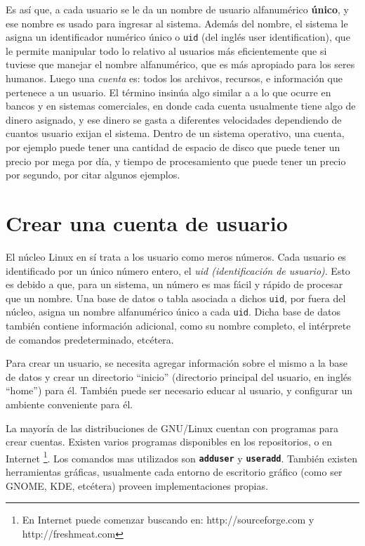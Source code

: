 \documentclass[12pt]{article}
\begin{document}
Es así que, a cada usuario se le da un nombre de usuario alfanumérico  
\textbf{único}, y ese nombre es usado para ingresar al sistema. 
Además del nombre, el sistema le asigna un identificador numérico único o 
\texttt{uid} (del inglés user identification), que le permite manipular todo 
lo relativo al usuarios más eficientemente que si tuviese que manejar el 
nombre alfanumérico, que es más apropiado para los seres humanos.   
Luego una \textit{cuenta} es: todos los archivos, recursos, e información 
que pertenece a un usuario. El término insinúa algo similar a 
a lo que ocurre en bancos y en sistemas comerciales, en donde cada cuenta 
usualmente tiene algo de dinero asignado, y ese dinero se gasta a 
diferentes velocidades dependiendo de cuantos usuario exijan el sistema.
Dentro de un sistema operativo, una cuenta, por ejemplo  puede tener una 
cantidad de espacio de disco que puede tener un precio por mega por día, y
tiempo de procesamiento que puede tener un precio por segundo, por citar algunos
ejemplos. 

\section*{Crear una cuenta de usuario}
El núcleo Linux en sí trata a los usuario como meros números. Cada
usuario es identificado por un único número entero, el \textit{uid
(identificación de usuario)}. Esto es debido a que, para un sistema, un número es mas fácil
y rápido de procesar que un nombre. Una base de datos o tabla
asociada a dichos \texttt{uid}, por fuera del núcleo, asigna un nombre alfanumérico 
único a cada \texttt{uid}. Dicha base de datos también contiene información adicional, 
como su nombre completo, el intérprete de comandos predeterminado, etcétera. 

Para crear un usuario, se necesita agregar información sobre el mismo a la
base de datos y crear un directorio ``inicio'' (directorio principal
del usuario, en inglés ``home'') para él. También puede ser necesario educar al 
usuario, y configurar un ambiente conveniente para él.

La mayoría de las distribuciones de GNU/Linux cuentan con programas para crear
cuentas. Existen varios programas disponibles en los repositorios,
o en Internet \footnote{En Internet puede comenzar buscando en:
http://sourceforge.com y http://freshmeat.com}.  
Los comandos mas utilizados son \texttt{\textbf{adduser}} y
\texttt{\textbf{useradd}}. También existen herramientas gráficas, usualmente 
cada entorno de escritorio gráfico (como ser GNOME, KDE, etcétera) proveen  
implementaciones propias. 
\end{document}
